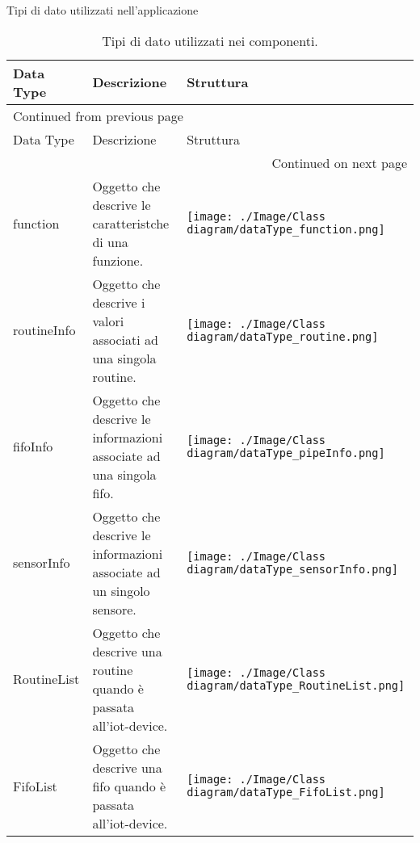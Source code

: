 \documentclass[onecolumn,a4paper]{article}
\begin{document}
Tipi di dato utilizzati nell'applicazione

\begin{longtable}{|l|p{5.2cm}|p{4cm}|}
\caption{Tipi di dato utilizzati nei componenti.}
\\
\hline
Data Type & Descrizione & Struttura\\
\hline
\endfirsthead
\multicolumn{3}{l}{Continued from previous page} \\
\hline

Data Type & Descrizione & Struttura \\

\hline
\endhead
\hline\multicolumn{3}{r}{Continued on next page} \\
\endfoot
\endlastfoot
\hline
function & Oggetto che descrive le caratteristche di una funzione. & \begin{center}
\texttt{[image: ./Image/Class diagram/dataType\_function.png]}
\end{center}\\
\hline
routineInfo & Oggetto che descrive i valori associati ad una singola routine. & \begin{center}
\texttt{[image: ./Image/Class diagram/dataType\_routine.png]}
\end{center}\\
\hline
fifoInfo & Oggetto che descrive le informazioni associate ad una singola fifo. & \begin{center}
\texttt{[image: ./Image/Class diagram/dataType\_pipeInfo.png]}
\end{center}\\
\hline
sensorInfo & Oggetto che descrive le informazioni associate ad un singolo sensore. & \begin{center}
\texttt{[image: ./Image/Class diagram/dataType\_sensorInfo.png]}
\end{center}\\
\hline
RoutineList & Oggetto che descrive una routine quando è passata all'iot-device. & \begin{center}
\texttt{[image: ./Image/Class diagram/dataType\_RoutineList.png]}
\end{center}\\
\hline
FifoList & Oggetto che descrive una fifo quando è passata all'iot-device. & \begin{center}
\texttt{[image: ./Image/Class diagram/dataType\_FifoList.png]}
\end{center}\\

\end{longtable}
\end{document}
